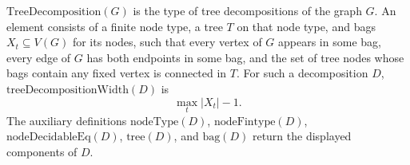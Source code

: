 \(\mathrm{TreeDecomposition}(G)\) is the type of tree decompositions of
the graph \(G\).  An element consists of a finite node type, a tree \(T\) on
that node type, and bags \(X_t\subseteq V(G)\) for its nodes, such that every
vertex of \(G\) appears in some bag, every edge of \(G\) has both endpoints in
some bag, and the set of tree nodes whose bags contain any fixed vertex is
connected in \(T\).  For such a decomposition \(D\),
\(\mathrm{treeDecompositionWidth}(D)\) is
\[
  \max_t |X_t|-1 .
\]
The auxiliary definitions \(\mathrm{nodeType}(D)\),
\(\mathrm{nodeFintype}(D)\), \(\mathrm{nodeDecidableEq}(D)\),
\(\mathrm{tree}(D)\), and \(\mathrm{bag}(D)\) return the displayed
components of \(D\).
